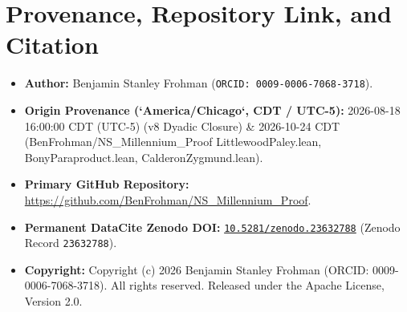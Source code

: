\documentclass[11pt,letterpaper]{article}
\begin{document}
\section*{Provenance, Repository Link, and Citation}
\begin{itemize}[leftmargin=2em]
  \item \textbf{Author:} Benjamin Stanley Frohman (\texttt{ORCID: 0009-0006-7068-3718}).
  \item \textbf{Origin Provenance (`America/Chicago`, CDT / UTC-5):} 2026-08-18 16:00:00 CDT (UTC-5) (v8 Dyadic Closure) \& 2026-10-24 CDT (BenFrohman/NS\_Millennium\_Proof LittlewoodPaley.lean, BonyParaproduct.lean, CalderonZygmund.lean).
  \item \textbf{Primary GitHub Repository:} \url{https://github.com/BenFrohman/NS_Millennium_Proof}.
  \item \textbf{Permanent DataCite Zenodo DOI:} \href{https://doi.org/10.5281/zenodo.23632788}{\texttt{10.5281/zenodo.23632788}} (Zenodo Record \texttt{23632788}).
  \item \textbf{Copyright:} Copyright (c) 2026 Benjamin Stanley Frohman (ORCID: 0009-0006-7068-3718). All rights reserved. Released under the Apache License, Version 2.0.
\end{itemize}
\end{document}
